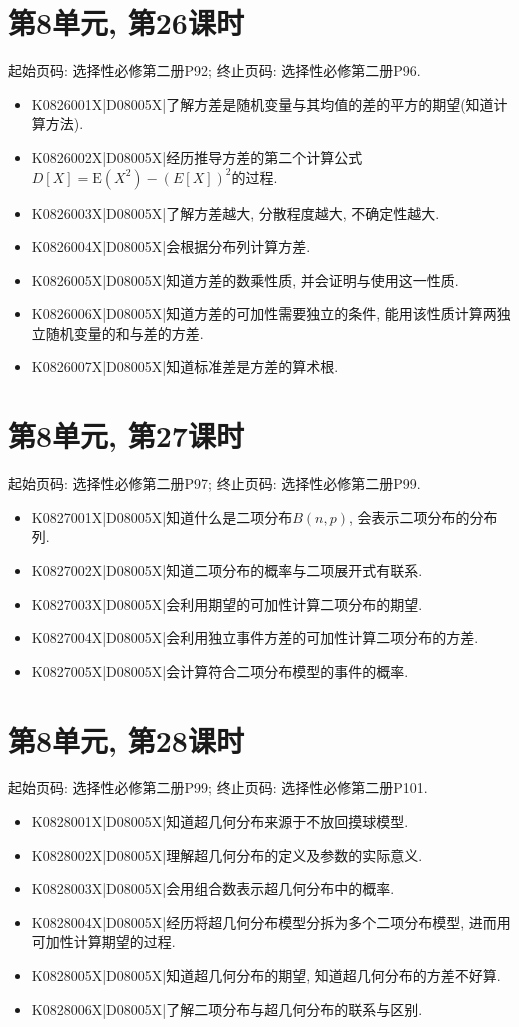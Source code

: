 \section*{第8单元, 第26课时}
起始页码: 选择性必修第二册P92; 终止页码: 选择性必修第二册P96.
\begin{itemize}
\item K0826001X|D08005X|了解方差是随机变量与其均值的差的平方的期望(知道计算方法).
\item K0826002X|D08005X|经历推导方差的第二个计算公式$D[X]=\mathrm{E}(X^2)-(E[X])^2$的过程.
\item K0826003X|D08005X|了解方差越大, 分散程度越大, 不确定性越大.
\item K0826004X|D08005X|会根据分布列计算方差.
\item K0826005X|D08005X|知道方差的数乘性质, 并会证明与使用这一性质.
\item K0826006X|D08005X|知道方差的可加性需要独立的条件, 能用该性质计算两独立随机变量的和与差的方差.
\item K0826007X|D08005X|知道标准差是方差的算术根.
\end{itemize}

\section*{第8单元, 第27课时}
起始页码: 选择性必修第二册P97; 终止页码: 选择性必修第二册P99.
\begin{itemize}
\item K0827001X|D08005X|知道什么是二项分布$B(n,p)$, 会表示二项分布的分布列.
\item K0827002X|D08005X|知道二项分布的概率与二项展开式有联系.
\item K0827003X|D08005X|会利用期望的可加性计算二项分布的期望.
\item K0827004X|D08005X|会利用独立事件方差的可加性计算二项分布的方差.
\item K0827005X|D08005X|会计算符合二项分布模型的事件的概率.
\end{itemize}

\section*{第8单元, 第28课时}
起始页码: 选择性必修第二册P99; 终止页码: 选择性必修第二册P101.
\begin{itemize}
\item K0828001X|D08005X|知道超几何分布来源于不放回摸球模型.
\item K0828002X|D08005X|理解超几何分布的定义及参数的实际意义.
\item K0828003X|D08005X|会用组合数表示超几何分布中的概率.
\item K0828004X|D08005X|经历将超几何分布模型分拆为多个二项分布模型, 进而用可加性计算期望的过程.
\item K0828005X|D08005X|知道超几何分布的期望, 知道超几何分布的方差不好算.
\item K0828006X|D08005X|了解二项分布与超几何分布的联系与区别.
\end{itemize}

